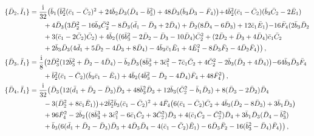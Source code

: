 \documentclass[10pt]{amsart}
\theoremstyle{definition}
\theoremstyle{corollary}
\theoremstyle{remark}
\theoremstyle{conclusion}
\begin{document}
\begin{align}
\{\bar{D}_2, \bar{I}_1\}&=\frac{{\rm i}}{32}\bigl( \bar{b}_1 \bigl( \bar{b}_2^2(\bar{c}_1-\bar{C}_2)^2+24 \bar{b}_2\bar{D}_3(\bar{D}_4-\bar{b}_3^2)+48\bar{D}_3(\bar{b}_3 \bar{D}_3-\bar{F}_4)\bigl)+4 \bar{b}_2^2(\bar{c}_1-\bar{C}_2)(\bar{b}_3\bar{C}_2-2\bar{E}_1)  \nonumber \\
& \hskip 0.7 cm +4\bar{D}_3\bigl(3\bar{D}_2^2-16\bar{b}_3\bar{C}_2^2-8\bar{D}_3(\bar{d}_1-\bar{D}_3+2\bar{D}_4)+\bar{D}_2(8\bar{D}_4-6\bar{D}_3)+12 \bar{c}_1 \bar{E}_1 \bigl)-16 \bar{F}_4 (2 \bar{b}_3 \bar{D}_2  \nonumber \\
& \hskip 0.7 cm+3(\bar{c}_1-2 \bar{C}_2)\bar{C}_2)+4 \bar{b}_2 \bigl((6 \bar{b}_3^2-2\bar{D}_2-\bar{D}_3-10 \bar{D}_4) \bar{C}_2^2+(2\bar{D}_2+\bar{D}_3+4\bar{D}_4)\bar{c}_1 \bar{C}_2  \nonumber \\
& \hskip 0.7 cm+2\bar{b}_3 \bar{D}_3(4\bar{d}_1+5\bar{D}_2-4\bar{D}_3+8\bar{D}_4)-4\bar{b}_3\bar{c}_1\bar{E}_1+4\bar{E}_1^2-8\bar{D}_3\bar{F}_2-4\bar{D}_2\bar{F}_4 \bigl) \bigl) \, ,  \nonumber \\
\{\bar{D}_3, \bar{I}_1\}&= \frac{{\rm i}}{8} \bigl(2 \bar{D}_3^2(12 \bar{b}_3^2+\bar{D}_2-4\bar{D}_4)-\bar{b}_2 \bar{D}_3\bigl(8 \bar{b}_3^3+3\bar{c}_1^2-7 \bar{c}_1 \bar{C}_2+4\bar{C}_2^2-2\bar{b}_3(\bar{D}_2+4\bar{D}_4)\bigl)-64 \bar{b}_3 \bar{D}_3 \bar{F}_4  \nonumber \\
& \hskip 0.7 cm+\bar{b}_2^2(\bar{c}_1-\bar{C}_2)(\bar{b}_3 \bar{c}_1-\bar{E}_1)+4\bar{b}_2(4\bar{b}_3^2-\bar{D}_2-4\bar{D}_4)\bar{F}_4+48 \bar{F}_4^2 \bigl) \, ,  \nonumber \\
\{\bar{D}_4, \bar{I}_1\}&=\frac{{\rm i}}{32}\bigl(\bar{D}_3 \bigl( 12(\bar{d}_1+\bar{D}_2-\bar{D}_3)\bar{D}_3+48 \bar{b}_3^2 \bar{D}_3+12\bar{b}_3(\bar{C}_2^2-\bar{b}_1 \bar{D}_3)+8(\bar{D}_3-2\bar{D}_2)\bar{D}_4 \nonumber \\
& \hskip 0.7 cm-3(\bar{D}_2^2+8\bar{c}_1\bar{E}_1)\bigl)+2\bar{b}_2^2 \bar{b}_3(\bar{c}_1-\bar{C}_2)^2+4 \bar{F}_4\bigl(6(\bar{c}_1-\bar{C}_2)\bar{C}_2+4\bar{b}_3(\bar{D}_2-8\bar{D}_3)+3\bar{b}_1\bar{D}_3 \bigl)  \nonumber \\
& \hskip 0.7 cm +96 \bar{F}_4^2-2\bar{b}_2 \bigl( (8 \bar{b}_3^3+3\bar{c}_1^2-6 \bar{c}_1 \bar{C}_2+3\bar{C}_2^2)\bar{D}_3+4(\bar{c}_1 \bar{C}_2-\bar{C}_2^2)\bar{D}_4+3\bar{b}_1\bar{D}_3(\bar{D}_4-\bar{b}_3^2) \nonumber \\
& \hskip 0.7 cm +\bar{b}_3(6(\bar{d}_1+\bar{D}_2-\bar{D}_3)\bar{D}_3+4\bar{D}_3 \bar{D}_4-4(\bar{c}_1-\bar{C}_2)\bar{E}_1)-6 \bar{D}_3 \bar{F}_2-16 (\bar{b}_3^2-\bar{D}_4)\bar{F}_4	\bigl)\bigl) \, , \nonumber \\

\end{align}
\end{document}
